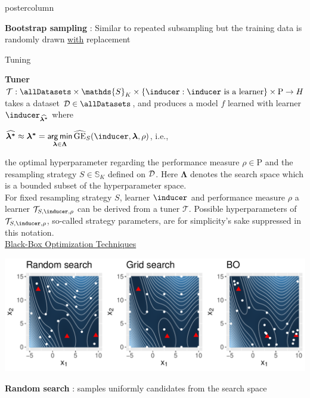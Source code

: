 \documentclass{beamer}
\begin{document}
\begin{frame}[fragile]{}
\begin{columns}
\begin{column}{.31\textwidth}
\begin{beamercolorbox}[center]{postercolumn}
\begin{minipage}{.98\textwidth}
{\textbf{Bootstrap sampling} : Similar to repeated subsampling but the training data is randomly drawn \underline{with} replacement\\ 
\begin{myblock}{Tuning}

\textbf{Tuner} $\mathcal{T}: \allDatasets \times \mathds{S}_K \times \{\inducer: \inducer \textrm{ is a learner}\} \times \mathrm{P} \rightarrow \Hspace$ takes a dataset $\D \in \allDatasets$, and produces a model $f$ learned with learner $\inducer_{\boldsymbol{\widehat{\lambda^*}}}$ where
\begin{center}$\boldsymbol{\widehat{\lambda^*}} \approx \boldsymbol{\lambda^*} = \argmin \limits_{\boldsymbol{\lambda} \in \bm{\Lambda}} \widehat{\mathrm{GE}}_S(\inducer, \boldsymbol\lambda, \rho)$, i.e.,\end{center} the optimal hyperparameter regarding the performance measure $\rho \in \mathrm{P}$ and the resampling strategy $S \in \mathds{S}_K$ defined on $\mathcal{D}$. Here $\bm{\Lambda}$ denotes the search space which is a bounded subset of the hyperparameter space.\\

For fixed resampling strategy $S$, learner $\inducer$ and performance measure $\rho$ a learner $\mathcal{T}_{S,\inducer,\rho}$ can be derived from a tuner $\mathcal{T}.$ Possible hyperparameters of $\mathcal{T}_{S,\inducer,\rho}$, so-called strategy parameters, are for simplicity's sake suppressed in this notation.\\

\underline{Black-Box Optimization Techniques}\\

 \begin{center}
             \includegraphics[width=0.95\columnwidth]{figure/bb_cmp.pdf}
               \end{center}
\textbf{Random search} : samples uniformly candidates from the search space\\


\end{myblock}}
\end{minipage}
\end{beamercolorbox}
\end{column}
\end{columns}
\end{frame}
\end{document}
